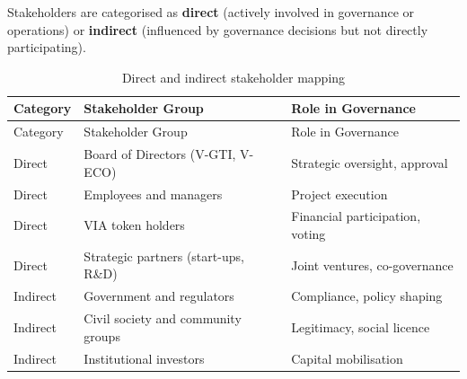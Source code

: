 \documentclass[
  english,
  12pt,
  oneside,
  open=any]{scrbook}
\begin{document}
Stakeholders are categorised as \textbf{direct} (actively involved in
governance or operations) or \textbf{indirect} (influenced by governance
decisions but not directly participating).

\begin{longtable}[]{@{}
  >{\raggedright\arraybackslash}p{}
  >{\raggedright\arraybackslash}p{}
  >{\raggedright\arraybackslash}p{}@{}}
\caption{Direct and indirect stakeholder
mapping}\label{tbl-stakeholders}\tabularnewline
\toprule\noalign{}
\begin{minipage}[b]{\linewidth}\raggedright
Category
\end{minipage} & \begin{minipage}[b]{\linewidth}\raggedright
Stakeholder Group
\end{minipage} & \begin{minipage}[b]{\linewidth}\raggedright
Role in Governance
\end{minipage} \\
\midrule\noalign{}
\endfirsthead
\toprule\noalign{}
\begin{minipage}[b]{\linewidth}\raggedright
Category
\end{minipage} & \begin{minipage}[b]{\linewidth}\raggedright
Stakeholder Group
\end{minipage} & \begin{minipage}[b]{\linewidth}\raggedright
Role in Governance
\end{minipage} \\
\midrule\noalign{}
\endhead
\bottomrule\noalign{}
\endlastfoot
Direct & Board of Directors (V-GTI, V-ECO) & Strategic oversight,
approval \\
Direct & Employees and managers & Project execution \\
Direct & VIA token holders & Financial participation, voting \\
Direct & Strategic partners (start-ups, R\&D) & Joint ventures,
co-governance \\
Indirect & Government and regulators & Compliance, policy shaping \\
Indirect & Civil society and community groups & Legitimacy, social
licence \\
Indirect & Institutional investors & Capital mobilisation \\
\end{longtable}
\end{document}
